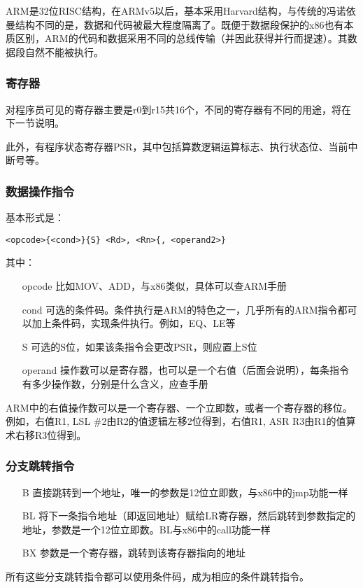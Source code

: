 ARM是32位RISC结构，在ARMv5以后，基本采用Harvard结构，与传统的冯诺依曼结构不同的是，数据和代码被最大程度隔离了。既便于数据段保护的x86也有本质区别，ARM的代码和数据采用不同的总线传输（并因此获得并行而提速）。其数据段自然不能被执行。

\subsubsection{寄存器}
对程序员可见的寄存器主要是r0到r15共16个，不同的寄存器有不同的用途，将在下一节说明。

此外，有程序状态寄存器PSR，其中包括算数逻辑运算标志、执行状态位、当前中断号等。

\subsubsection{数据操作指令}
基本形式是：
\begin{lstlisting}[numbers=none]
<opcode>{<cond>}{S} <Rd>, <Rn>{, <operand2>}
\end{lstlisting}
其中：
\begin{itemize}
\item[opcode] 比如MOV、ADD，与x86类似，具体可以查ARM手册
\item[cond] 可选的条件码。条件执行是ARM的特色之一，几乎所有的ARM指令都可以加上条件码，实现条件执行。例如，EQ、LE等
\item[S] 可选的S位，如果该条指令会更改PSR，则应置上S位
\item[operand] 操作数可以是寄存器，也可以是一个右值（后面会说明），每条指令有多少操作数，分别是什么含义，应查手册
\end{itemize}

ARM中的右值操作数可以是一个寄存器、一个立即数，或者一个寄存器的移位。例如，右值R1, LSL \#2由R2的值逻辑左移2位得到，右值R1, ASR R3由R1的值算术右移R3位得到。

\subsubsection{分支跳转指令}
\begin{itemize}
\item[B] 直接跳转到一个地址，唯一的参数是12位立即数，与x86中的jmp功能一样
\item[BL] 将下一条指令地址（即返回地址）赋给LR寄存器，然后跳转到参数指定的地址，参数是一个12位立即数。BL与x86中的call功能一样
\item[BX] 参数是一个寄存器，跳转到该寄存器指向的地址
\end{itemize}
所有这些分支跳转指令都可以使用条件码，成为相应的条件跳转指令。

